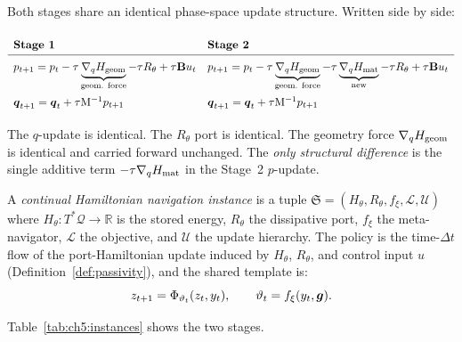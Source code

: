 Both stages share an identical phase-space update structure.
Written side by side:

\begin{equation}
\renewcommand{\arraystretch}{1.6}
\begin{array}{ll}
\textbf{Stage~1} & \textbf{Stage~2} \\
\hline
\Mom_{t+1} = \Mom_t
  - \tau\underbrace{\nabla_\Pos H_{\mathrm{geom}}}_{\text{geom. force}}
  - \tau R_\theta
  + \tau\mathbf{B}u_t
&
\Mom_{t+1} = \Mom_t
  - \tau\underbrace{\nabla_\Pos H_{\mathrm{geom}}}_{\text{geom. force}}
  - \tau\underbrace{\nabla_\Pos H_{\mathrm{mat}}}_{\mathbf{\text{new}}}
  - \tau R_\theta
  + \tau\mathbf{B}u_t \\[4pt]
\vec{q}_{t+1} = \vec{q}_t + \tau\Mass^{-1}\Mom_{t+1}
&
\vec{q}_{t+1} = \vec{q}_t + \tau\Mass^{-1}\Mom_{t+1}
\end{array}
\label{eq:ch5:side_by_side}
\end{equation}

The $q$-update is identical.
The $R_\theta$ port is identical.
The geometry force $\nabla_q H_{\mathrm{geom}}$ is identical and
carried forward unchanged.
The \emph{only structural difference} is the single additive term
$-\tau\nabla_q H_{\mathrm{mat}}$ in the Stage~2 $p$-update.

\begin{definition}
\label{def:ch5:instance}
A \emph{continual Hamiltonian navigation instance} is a tuple
$\mathfrak{S} = (H_\theta, R_\theta, f_\xi, \mathcal{L}, \mathcal{U})$
where $H_\theta : T^*\mathcal{Q}\to\mathbb{R}$ is the stored energy,
$R_\theta$ the dissipative port, $f_\xi$ the meta-navigator,
$\mathcal{L}$ the objective, and $\mathcal{U}$ the update hierarchy.
The policy is the time-$\Delta t$ flow of the port-Hamiltonian update
induced by $H_\theta$, $R_\theta$, and control input $u$
(Definition~\ref{def:passivity}), and the
shared template is:
\begin{equation}
  z_{t+1} = \Phi_{\vartheta_t}(z_t, y_t),
  \qquad
  \vartheta_t = f_\xi(y_t, \boldsymbol{g}).
  \label{eq:ch5:template}
\end{equation}
\end{definition}

Table~\ref{tab:ch5:instances} shows the two stages.

